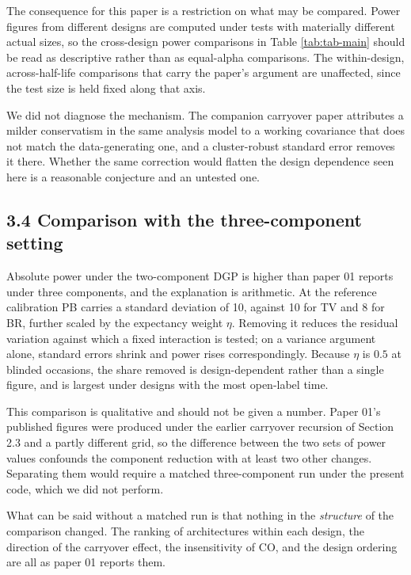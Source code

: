 \documentclass[
  11pt,
]{article}
\begin{document}
The consequence for this paper is a restriction on what may be
compared. Power figures from different designs are computed under
tests with materially different actual sizes, so the cross-design
power comparisons in Table \ref{tab:tab-main} should be read as
descriptive rather than as equal-alpha comparisons. The
within-design, across-half-life comparisons that carry the paper's
argument are unaffected, since the test size is held fixed along that
axis.

We did not diagnose the mechanism. The companion carryover paper
attributes a milder conservatism in the same analysis model to a
working covariance that does not match the data-generating one, and a
cluster-robust standard error removes it there. Whether the same
correction would flatten the design dependence seen here is a
reasonable conjecture and an untested one.

\subsection{3.4 Comparison with the three-component setting}

Absolute power under the two-component DGP is higher than paper 01
reports under three components, and the explanation is arithmetic.
At the reference calibration PB carries a standard deviation of 10,
against 10 for TV and 8 for BR, further scaled by the expectancy
weight \(\eta\). Removing it reduces the residual variation against
which a fixed interaction is tested; on a variance argument alone,
standard errors shrink and power rises correspondingly. Because
\(\eta\) is \(0.5\) at blinded occasions, the share removed is
design-dependent rather than a single figure, and is largest under
designs with the most open-label time.

This comparison is qualitative and should not be given a number.
Paper 01's published figures were produced under the earlier
carryover recursion of Section 2.3 and a partly different grid, so
the difference between the two sets of power values confounds the
component reduction with at least two other changes. Separating them
would require a matched three-component run under the present code,
which we did not perform.

What can be said without a matched run is that nothing in the
\emph{structure} of the comparison changed. The ranking of
architectures within each design, the direction of the carryover
effect, the insensitivity of CO, and the design ordering are all as
paper 01 reports them.
\end{document}
